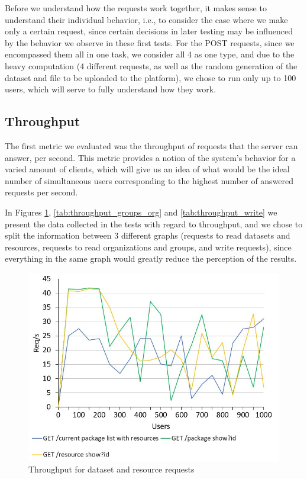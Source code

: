   Before we understand how the requests work together, it makes sense to understand their individual behavior, i.e., to consider the case where we make only a certain request, since certain decisions in later testing may be influenced by the behavior we observe in these first tests. For the POST requests, since we encompassed them all in one task, we consider all 4 as one type, and due to the heavy computation (4 different requests, as well as the random generation of the dataset and file to be uploaded to the platform), we chose to run only up to 100 users, which will serve to fully understand how they work.
  
  \subsection{Throughput}
  
  The first metric we evaluated was the throughput of requests that the server can answer, per second. This metric provides a notion of the system's behavior for a varied amount of clients, which will give us an idea of what would be the ideal number of simultaneous users corresponding to the highest number of answered requests per second.
  
  In Figures \ref{tab:throughput_datasets}, \ref{tab:throughput_groups_org} and  \ref{tab:throughput_write} we present the data collected in the tests with regard to throughput, and we chose to split the information between 3 different graphs (requests to read datasets and resources, requests to read organizations and groups, and write requests), since everything in the same graph would greatly reduce the perception of the results.
  
  \begin{figure}[H]
    \centering
    \includegraphics[width=.69\textwidth]{img/performance_evaluation/datasets_individuais.JPG}
    \caption{\label{tab:throughput_datasets}Throughput for dataset and resource requests}
  \end{figure}
  
